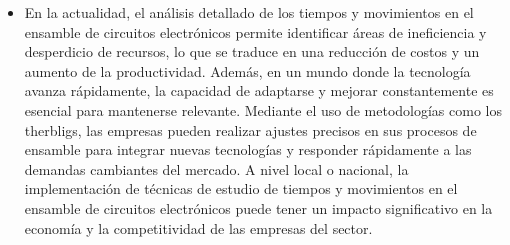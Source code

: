     \begin{itemize}
    \item En la actualidad, el análisis detallado de los tiempos y movimientos en el ensamble de circuitos electrónicos permite identificar áreas de ineficiencia y desperdicio de recursos, lo que se traduce en una reducción de costos y un aumento de la productividad.
    Además, en un mundo donde la tecnología avanza rápidamente, la capacidad de adaptarse y mejorar constantemente es esencial para mantenerse relevante. Mediante el uso de metodologías como los therbligs, las empresas pueden realizar ajustes precisos en sus procesos de ensamble para integrar nuevas tecnologías y responder rápidamente a las demandas cambiantes del mercado.\cite{niebel1980ingenieria}
    A nivel local o nacional, la implementación de técnicas de estudio de tiempos y movimientos en el ensamble de circuitos electrónicos puede tener un impacto significativo en la economía y la competitividad de las empresas del sector. 
    \end{itemize}
